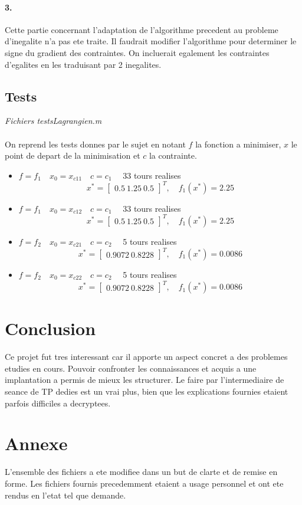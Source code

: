 \documentclass[12pt]{article}
\begin{document}
\paragraph{3.}
Cette partie concernant l'adaptation de l'algorithme precedent au probleme d'inegalite n'a pas ete traite. Il faudrait modifier l'algorithme pour determiner le signe du gradient des contraintes. On incluerait egalement les contraintes d'egalites en les traduisant par 2 inegalites.

\subsection{Tests}
\begin{flushright}
\textit{Fichiers testsLagrangien.m}
\end{flushright}
\paragraph{}
On reprend les tests donnes par le sujet en notant $f$ la fonction a minimiser, $x$ le point de depart de la minimisation et $c$ la contrainte.
\begin{itemize}
	\item $f=f_1 \quad x_0 = x_{c11} \quad c=c_1\quad$  33 tours realises
		\[x^* = \left[\begin{array}{c}0.5\ 1.25\ 0.5\end{array}\right]^T,\quad f_1(x^*) = 2.25\]
	\item $f=f_1 \quad x_0 = x_{c12} \quad c=c_1\quad$  33 tours realises
		\[x^* = \left[\begin{array}{c}0.5\ 1.25\ 0.5\end{array}\right]^T,\quad f_1(x^*) = 2.25\]
	\item $f=f_2 \quad x_0 = x_{c21} \quad c=c_2\quad$  5 tours realises
		\[x^* = \left[\begin{array}{c}0.9072\ 0.8228\end{array}\right]^T,\quad f_1(x^*) = 0.0086\]
	\item $f=f_2 \quad x_0 = x_{c22} \quad c=c_2\quad$  5 tours realises
		\[x^* = \left[\begin{array}{c}0.9072\ 0.8228\end{array}\right]^T,\quad f_1(x^*) = 0.0086\]
\end{itemize}


\newpage
\section*{Conclusion}
Ce projet fut tres interessant car il apporte un aspect concret a des problemes etudies en cours. Pouvoir confronter les connaissances et acquis a une implantation a permis de mieux les structurer.\newline
Le faire par l'intermediaire de seance de TP dedies est un vrai plus, bien que les explications fournies etaient parfois difficiles a decryptees.

\newpage
\section{Annexe}
L'ensemble des fichiers a ete modifiee dans un but de clarte et de remise en forme. Les fichiers fournis precedemment etaient a usage personnel et ont ete rendus en l'etat  tel que demande.
\end{document}
